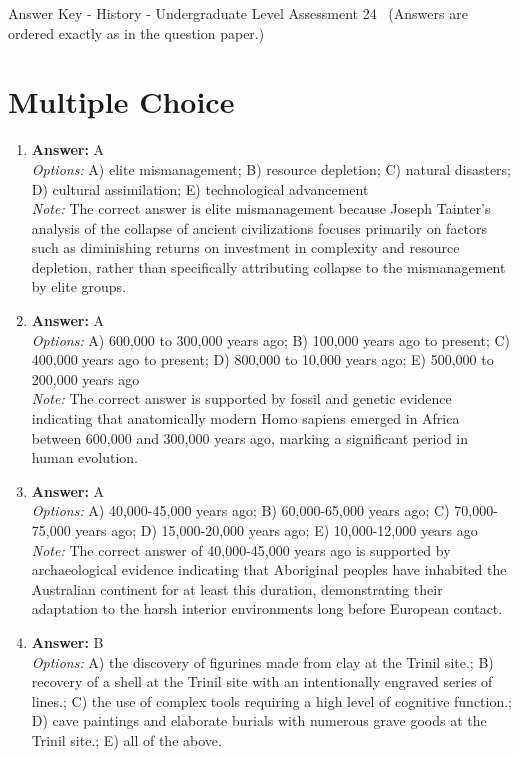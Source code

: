 \documentclass[12pt]{article}
\begin{document}
\begin{center}
Answer Key - History - Undergraduate Level Assessment 24 \
\small (Answers are ordered exactly as in the question paper.)
\end{center}

\section*{Multiple Choice}
\begin{enumerate}[label=\arabic*.]
\item \textbf{Answer:} A
\\ \textit{Options:} A) elite mismanagement; B) resource depletion; C) natural disasters; D) cultural assimilation; E) technological advancement
\\ \textit{Note:} The correct answer is elite mismanagement because Joseph Tainter's analysis of the collapse of ancient civilizations focuses primarily on factors such as diminishing returns on investment in complexity and resource depletion, rather than specifically attributing collapse to the mismanagement by elite groups.
\item \textbf{Answer:} A
\\ \textit{Options:} A) 600,000 to 300,000 years ago; B) 100,000 years ago to present; C) 400,000 years ago to present; D) 800,000 to 10,000 years ago; E) 500,000 to 200,000 years ago
\\ \textit{Note:} The correct answer is supported by fossil and genetic evidence indicating that anatomically modern Homo sapiens emerged in Africa between 600,000 and 300,000 years ago, marking a significant period in human evolution.
\item \textbf{Answer:} A
\\ \textit{Options:} A) 40,000-45,000 years ago; B) 60,000-65,000 years ago; C) 70,000-75,000 years ago; D) 15,000-20,000 years ago; E) 10,000-12,000 years ago
\\ \textit{Note:} The correct answer of 40,000-45,000 years ago is supported by archaeological evidence indicating that Aboriginal peoples have inhabited the Australian continent for at least this duration, demonstrating their adaptation to the harsh interior environments long before European contact.
\item \textbf{Answer:} B
\\ \textit{Options:} A) the discovery of figurines made from clay at the Trinil site.; B) recovery of a shell at the Trinil site with an intentionally engraved series of lines.; C) the use of complex tools requiring a high level of cognitive function.; D) cave paintings and elaborate burials with numerous grave goods at the Trinil site.; E) all of the above.

\end{enumerate}
\end{document}
